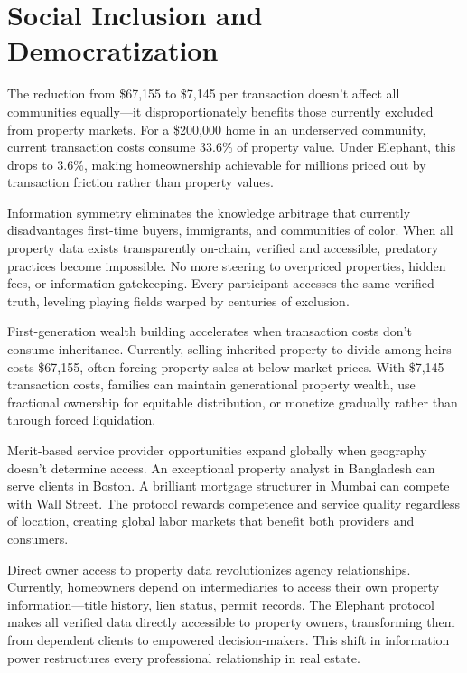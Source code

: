 \section{Social Inclusion and Democratization}

The reduction from \$67,155 to \$7,145 per transaction doesn't affect all communities equally—it disproportionately benefits those currently excluded from property markets. For a \$200,000 home in an underserved community, current transaction costs consume 33.6\% of property value. Under Elephant, this drops to 3.6\%, making homeownership achievable for millions priced out by transaction friction rather than property values.

Information symmetry eliminates the knowledge arbitrage that currently disadvantages first-time buyers, immigrants, and communities of color. When all property data exists transparently on-chain, verified and accessible, predatory practices become impossible. No more steering to overpriced properties, hidden fees, or information gatekeeping. Every participant accesses the same verified truth, leveling playing fields warped by centuries of exclusion.

First-generation wealth building accelerates when transaction costs don't consume inheritance. Currently, selling inherited property to divide among heirs costs \$67,155, often forcing property sales at below-market prices. With \$7,145 transaction costs, families can maintain generational property wealth, use fractional ownership for equitable distribution, or monetize gradually rather than through forced liquidation.

Merit-based service provider opportunities expand globally when geography doesn't determine access. An exceptional property analyst in Bangladesh can serve clients in Boston. A brilliant mortgage structurer in Mumbai can compete with Wall Street. The protocol rewards competence and service quality regardless of location, creating global labor markets that benefit both providers and consumers.

Direct owner access to property data revolutionizes agency relationships. Currently, homeowners depend on intermediaries to access their own property information—title history, lien status, permit records. The Elephant protocol makes all verified data directly accessible to property owners, transforming them from dependent clients to empowered decision-makers. This shift in information power restructures every professional relationship in real estate.

